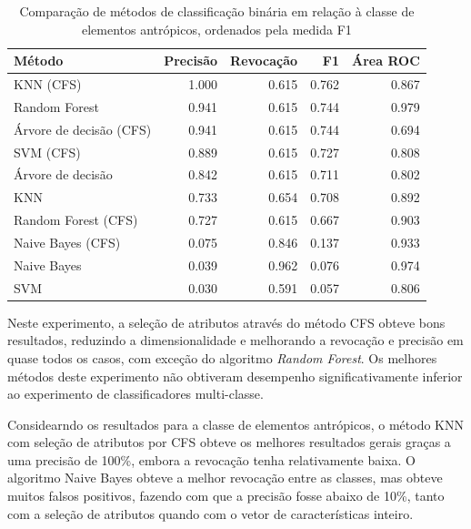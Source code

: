 \begin{table}[h]
\centering
\begin{tabulary}{\linewidth}{|L|R|R|R|R|}
\hline
\textbf{Método} & \textbf{Precisão} & \textbf{Revocação} & \textbf{F1} & \textbf{Área ROC} \\ \hline
KNN (CFS)               & 1.000 & 0.615 & 0.762 & 0.867 \\ \hline
Random Forest           & 0.941 & 0.615 & 0.744 & 0.979 \\ \hline
Árvore de decisão (CFS) & 0.941 & 0.615 & 0.744 & 0.694 \\ \hline
SVM (CFS)               & 0.889 & 0.615 & 0.727 & 0.808 \\ \hline
Árvore de decisão       & 0.842 & 0.615 & 0.711 & 0.802 \\ \hline
KNN                     & 0.733 & 0.654 & 0.708 & 0.892 \\ \hline
Random Forest (CFS)     & 0.727 & 0.615 & 0.667 & 0.903 \\ \hline
Naive Bayes (CFS)       & 0.075 & 0.846 & 0.137 & 0.933 \\ \hline
Naive Bayes             & 0.039 & 0.962 & 0.076 & 0.974 \\ \hline
SVM                     & 0.030 & 0.591 & 0.057 & 0.806 \\ \hline
\end{tabulary}
\caption{Comparação de métodos de classificação binária em relação à classe de elementos antrópicos, ordenados pela medida F1}
\label{tab:experimentoBiclasseAntropico}
\end{table}

Neste experimento, a seleção de atributos através do método CFS obteve bons resultados, reduzindo a dimensionalidade e melhorando a revocação e precisão em quase todos os casos, com exceção do algoritmo \textit{Random Forest}. Os melhores métodos deste experimento não obtiveram desempenho significativamente inferior ao experimento de classificadores multi-classe.

Considearndo os resultados para a classe de elementos antrópicos, o método KNN com seleção de atributos por CFS obteve os melhores resultados gerais graças a uma precisão de 100\%, embora a revocação tenha relativamente baixa. O algoritmo Naive Bayes obteve a melhor revocação entre as classes, mas obteve muitos falsos positivos, fazendo com que a precisão fosse abaixo de 10\%, tanto com a seleção de atributos quando com o vetor de características inteiro.

